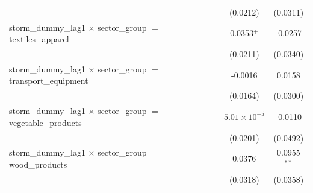 \begin{tabular}{lcccccccc}
                                                                                  &                       &                       &                       &                       &                       &                       & (0.0212)              & (0.0311)\\   
   storm\_dummy\_lag1 $\times$ sector\_group $=$ textiles\_apparel                &                       &                       &                       &                       &                       &                       & 0.0353$^{+}$          & -0.0257\\   
                                                                                  &                       &                       &                       &                       &                       &                       & (0.0211)              & (0.0340)\\   
   storm\_dummy\_lag1 $\times$ sector\_group $=$ transport\_equipment             &                       &                       &                       &                       &                       &                       & -0.0016               & 0.0158\\   
                                                                                  &                       &                       &                       &                       &                       &                       & (0.0164)              & (0.0300)\\   
   storm\_dummy\_lag1 $\times$ sector\_group $=$ vegetable\_products              &                       &                       &                       &                       &                       &                       & $5.01\times 10^{-5}$  & -0.0110\\   
                                                                                  &                       &                       &                       &                       &                       &                       & (0.0201)              & (0.0492)\\   
   storm\_dummy\_lag1 $\times$ sector\_group $=$ wood\_products                   &                       &                       &                       &                       &                       &                       & 0.0376                & 0.0955$^{**}$\\   
                                                                                  &                       &                       &                       &                       &                       &                       & (0.0318)              & (0.0358)\\   

\end{tabular}
